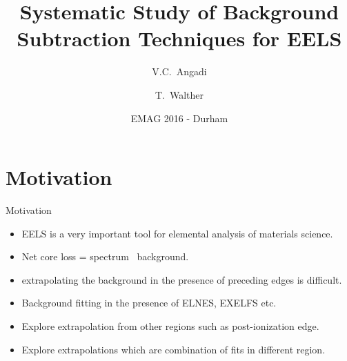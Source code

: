 \documentclass[aspectratio=169]{beamer}
\title{Systematic Study of Background Subtraction Techniques for EELS}
\author{V.C.~Angadi \and T.~Walther}
\institute[University of Sheffield] %
{
  Department of Electronic and Electrical Engineering\\
  University of Sheffield,\\
  Sheffield, UK
}
\date{EMAG 2016 - Durham}
\begin{document}
\begin{frame}
  \titlepage
\end{frame}


\section{Motivation}


\begin{frame}{Motivation}%
  \begin{itemize}
  \item EELS is a very important tool for elemental analysis of materials science.
  \item Net core loss = spectrum \textminus ~background.
  \item extrapolating the background in the presence of preceding edges is difficult.
  \item Background fitting in the presence of ELNES, EXELFS etc.
  \item Explore extrapolation from other regions such as post-ionization edge.
  \item Explore extrapolations which are combination of fits in different region.
  \end{itemize}
\end{frame}


\end{document}
